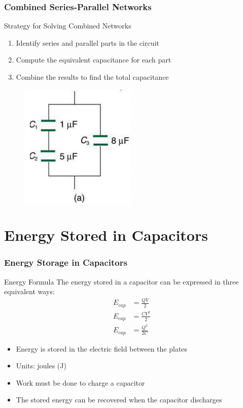 \documentclass{beamer}
\begin{document}
\begin{frame}
    \frametitle{Combined Series-Parallel Networks}
    
    \begin{block}{Strategy for Solving Combined Networks}
        \begin{enumerate}
            \item Identify series and parallel parts in the circuit
            \item Compute the equivalent capacitance for each part
            \item Combine the results to find the total capacitance
        \end{enumerate}
    \end{block}
    
    \begin{center}
 \begin{figure}
        \centering
        \includegraphics[width=0.3\linewidth]{phys12-circuits-series-parallel-capacitor-combo.png}
    \end{figure}
    
        
    \end{center}
\end{frame}

\section{Energy Stored in Capacitors}

\begin{frame}
    \frametitle{Energy Storage in Capacitors}
    
    \begin{block}{Energy Formula}
        The energy stored in a capacitor can be expressed in three equivalent ways:
        \begin{align}
            E_{cap} &= \frac{QV}{2} \\
            E_{cap} &= \frac{CV^2}{2} \\
            E_{cap} &= \frac{Q^2}{2C}
        \end{align}
    \end{block}
    
    \begin{itemize}
        \item Energy is stored in the electric field between the plates
        \item Units: joules (J)
        \item Work must be done to charge a capacitor
        \item The stored energy can be recovered when the capacitor discharges
    \end{itemize}
\end{frame}
\end{document}
